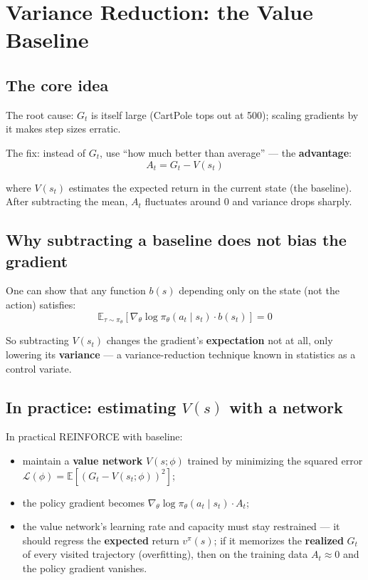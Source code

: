 \documentclass{article}
\begin{document}
\section*{Variance Reduction: the Value Baseline}

\subsection*{The core idea}

The root cause: $G_t$ is itself large (CartPole tops out at 500); scaling gradients by it makes step sizes erratic.

The fix: instead of $G_t$, use ``how much better than average'' --- the \textbf{advantage}:
\[
\boxed{A_t = G_t - V(s_t)}
\]

where $V(s_t)$ estimates the expected return in the current state (the baseline). After subtracting the mean, $A_t$ fluctuates around 0 and variance drops sharply.

\subsection*{Why subtracting a baseline does not bias the gradient}

One can show that any function $b(s)$ depending only on the state (not the action) satisfies:
\[
\mathbb{E}_{\tau \sim \pi_\theta}\!\left[\nabla_\theta \log \pi_\theta(a_t \mid s_t) \cdot b(s_t)\right] = 0
\]

So subtracting $V(s_t)$ changes the gradient's \textbf{expectation} not at all, only lowering its \textbf{variance} --- a variance-reduction technique known in statistics as a control variate.

\subsection*{In practice: estimating $V(s)$ with a network}

In practical REINFORCE with baseline:
\begin{itemize}
  \item maintain a \textbf{value network} $V(s;\phi)$ trained by minimizing the squared error $\mathcal{L}(\phi) = \mathbb{E}[(G_t - V(s_t;\phi))^2]$;
  \item the policy gradient becomes $\nabla_\theta \log \pi_\theta(a_t \mid s_t) \cdot A_t$;
  \item the value network's learning rate and capacity must stay restrained --- it should regress the \textbf{expected} return $v^\pi(s)$; if it memorizes the \textbf{realized} $G_t$ of every visited trajectory (overfitting), then on the training data $A_t \approx 0$ and the policy gradient vanishes.
\end{itemize}
\end{document}
